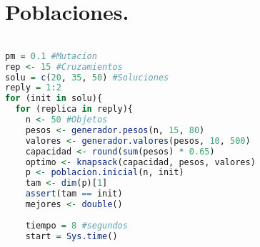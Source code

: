 \documentclass{article}
\begin{document}
\section{Poblaciones.}
\begin{lstlisting}[language=R, caption= Segmento de c\'odigo Poblaciones.]

pm = 0.1 #Mutacion
rep <- 15 #Cruzamientos
solu = c(20, 35, 50) #Soluciones
reply = 1:2
for (init in solu){
  for (replica in reply){
    n <- 50 #Objetos
    pesos <- generador.pesos(n, 15, 80)
    valores <- generador.valores(pesos, 10, 500)
    capacidad <- round(sum(pesos) * 0.65)
    optimo <- knapsack(capacidad, pesos, valores)
    p <- poblacion.inicial(n, init)
    tam <- dim(p)[1]
    assert(tam == init)
    mejores <- double()
    
    tiempo = 8 #segundos
    start = Sys.time()
\end{lstlisting}
\end{document}
